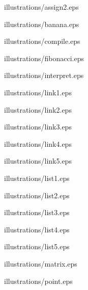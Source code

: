illustrations/assign2.eps

\centerline{}

illustrations/banana.eps

\centerline{}

illustrations/compile.eps

\centerline{}

illustrations/fibonacci.eps

\centerline{}

illustrations/interpret.eps

\centerline{}

illustrations/link1.eps

\centerline{}

illustrations/link2.eps

\centerline{}

illustrations/link3.eps

\centerline{}

illustrations/link4.eps

\centerline{}

illustrations/link5.eps

\centerline{}

illustrations/list1.eps

\centerline{}

illustrations/list2.eps

\centerline{}

illustrations/list3.eps

\centerline{}

illustrations/list4.eps


illustrations/list5.eps


illustrations/matrix.eps

\centerline{}

illustrations/point.eps

